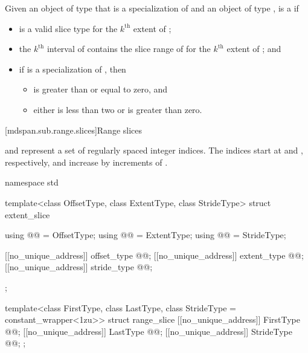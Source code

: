 \pnum
Given an object  of type 
that is a specialization of  and
an object  of type ,
 is a
if
\begin{itemize}
\item
   is a valid  slice type for the $k^\text{th}$ extent of ;
\item
  the $k^\text{th}$ interval of 
  contains the  slice range of 
  for the $k^\text{th}$ extent of ; and
\item
  if  is a specialization of , then
  \begin{itemize}
  \item {} is greater than or equal to zero, and
  \item either  is less than two or  is greater than zero.
  \end{itemize}
\end{itemize}

[mdspan.sub.range.slices]{Range slices}

\pnum
{} and  represent a set of
 regularly spaced integer indices.
The indices start at  and , respectively, and
increase by increments of .

%
%
\begin{codeblock}
namespace std {
  template<class OffsetType, class ExtentType, class StrideType>
  struct extent_slice {
    using @@ = OffsetType;
    using @@ = ExtentType;
    using @@ = StrideType;

    [[no_unique_address]] offset_type @@{};
    [[no_unique_address]] extent_type @@{};
    [[no_unique_address]] stride_type @@{};
  };

  template<class FirstType, class LastType, class StrideType = constant_wrapper<1zu>>
  struct range_slice {
    [[no_unique_address]] FirstType @@{};
    [[no_unique_address]] LastType @@{};
    [[no_unique_address]] StrideType @@{};
  };
}
\end{codeblock}

